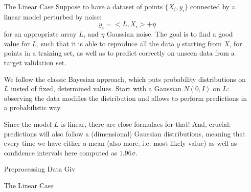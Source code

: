 \documentclass[twocolumn,9pt]{article}
\author {-}
\theoremstyle{definition}
\theoremstyle{remark}
\begin{document}

\begin{abstract}
Use the signature to linearize the problem of time series prediction.
Use the bayesian theory to solve the problem taking advantage of
the linear formulation.
\end{abstract}

\begin{section}{The Linear Case}
Suppose to have a dataset of points $\{X_i, y_i\}$ connected by a linear
model perturbed by noise:
\begin{equation}
y_i = <L, X_i> + \eta
\end{equation}
for an appropriate array $L$, and $\eta$ Gaussian noise.
The goal is to find a good value for $L$, such that it is able to reproduce
all the data $y$ starting from $X$, for points in a training set,
as well as to predict correctly on unseen data from a target 
validation set.

We follow the classic Bayesian approach, which puts probability distributions
on $L$ insted of fixed, determined values.
Start with a Gaussian $N(0, I)$ on $L$: observing the data modifies the
distribution and allows to perform predictions in a probabilistic way.


Since the model $L$ is linear, there are close formulaes for that!
And, crucial: predictions will also follow a (dimensional)
Gaussian distributions, meaning that every time we have either
a mean (also more, i.e. most likely value) as well as 
confidence intervals here computed as $1.96 \sigma$.

\end{section}


\begin{section}{Preprocessing Data}
Giv

\end{section}

\begin{section}{The Linear Case}

\end{section}



%
\end{document}
